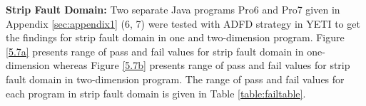 


\noindent \textbf{Strip Fault Domain:} Two separate Java programs Pro6 and Pro7 given in Appendix \ref{sec:appendix1} (6, 7) were tested with ADFD strategy in YETI to get the findings for strip fault domain in one and two-dimension program. Figure \ref{5.7a} presents range of pass and fail values for strip fault domain in one-dimension whereas Figure \ref{5.7b} presents range of pass and fail values for strip fault domain in two-dimension program. The range of pass and fail values for each program in strip fault domain is given in Table \ref{table:failtable}.


